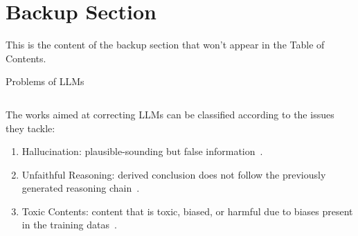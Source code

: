 \section*{Backup Section}
This is the content of the backup section that won't appear in the Table of Contents.

\begin{frame}{Problems of LLMs}
    \begin{columns}[T]
        \begin{column}{0.70\textwidth}
            The works aimed at correcting LLMs can be classified according to the issues they tackle:
            \begin{enumerate}
                \item Hallucination: plausible-sounding but false information~\cite{gao2023rarr, zhang2023language}.

                \item Unfaithful Reasoning: derived conclusion does not follow the previously generated reasoning chain~\cite{he2022rethinking, pan2023logiclm}.

                \item Toxic Contents: content that is toxic, biased, or harmful due to biases present in the training datas~\cite{lu2022quark, gou2023critic}.


\end{enumerate}
\end{column}
\end{columns}
\end{frame}
